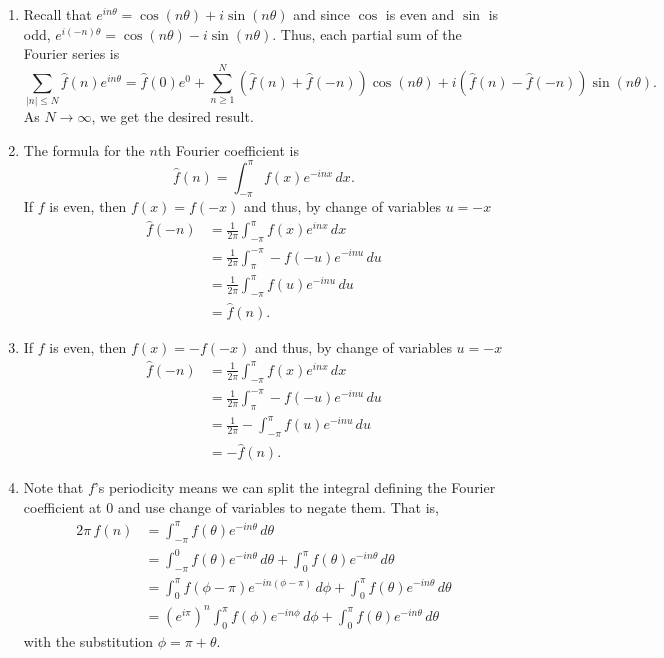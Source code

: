 \documentclass[12 pt, letterpaper]{hmcpset}
\begin{document}
\begin{solution}
	\begin{enumerate}
		\item Recall that $e^{i n \theta} = \cos{(n \theta)} + i \sin{(n \theta)}$ and since $\cos$ is even and $\sin{}$ is odd, $e^{i (-n) \theta} = \cos{(n \theta)} - i \sin{(n \theta)}$. Thus, each partial sum of the Fourier series is
			\[
				\sum_{\lvert n \rvert \le N} \hat{f}(n) e^{i n \theta} = \hat{f}(0) e^{0} + \sum_{n \ge 1}^{N} (\hat{f}(n) + \hat{f}(-n)) \cos{(n \theta)} + i (\hat{f}(n) - \hat{f}(-n)) \sin{(n \theta)}.
			\]
			As $N \to \infty$, we get the desired result.
		\item The formula for the $n$th Fourier coefficient is
			\[
				\hat{f}(n) = \int_{-\pi}^{\pi} f(x) e^{-i n x} \, dx. 
			\]
			If $f$ is even, then $f(x) = f(-x)$ and thus, by change of variables $u = -x$
			\begin{align*}
				\hat{f}(-n) & = \frac{1}{2 \pi} \int_{-\pi}^{\pi} f(x) e^{i n x} \, dx \\
					    & = \frac{1}{2 \pi} \int_{\pi}^{-\pi} - f(-u) e^{- i n u} \, du \\
					    & = \frac{1}{2 \pi} \int_{- \pi}^{\pi} f(u) e^{-i n u} \, du \\
					    & = \hat{f}(n).
			\end{align*}
		\item If $f$ is even, then $f(x) = - f(-x)$ and thus, by change of variables $u = -x$
			\begin{align*}
				\hat{f}(-n) & = \frac{1}{2 \pi} \int_{-\pi}^{\pi} f(x) e^{i n x} \, dx \\
					    & = \frac{1}{2 \pi} \int_{\pi}^{-\pi} - f(-u) e^{- i n u} \, du \\
					    & = \frac{1}{2 \pi} - \int_{- \pi}^{\pi} f(u) e^{-i n u} \, du \\
					    & = - \hat{f}(n).
			\end{align*}
		\item Note that $f$'s periodicity means we can split the integral defining the Fourier coefficient at $0$ and use change of variables to negate them. That is,
			\begin{align*}
				2 \pi \, \hat{f}(n) & = \int_{-\pi}^{\pi} f(\theta) e^{-i n \theta} \, d \theta \\
					   & = \int_{-\pi}^{0} f(\theta) e^{-i n \theta} \, d\theta + \int_{0}^{\pi} f(\theta) e^{-i n \theta} \, d \theta \\
					   & = \int_{0}^{\pi} f(\phi - \pi) e^{-i n (\phi - \pi)} \, d \phi + \int_{0}^{\pi} f(\theta) e^{-i n \theta} \, d \theta \\
					   & = (e^{i \pi})^{n} \int_{0}^{\pi} f(\phi) e^{-i n \phi} \, d \phi + \int_{0}^{\pi} f(\theta) e^{-i n \theta} \, d \theta
			\end{align*}
			with the substitution $\phi = \pi + \theta$.


\end{enumerate}
\end{solution}
\end{document}
